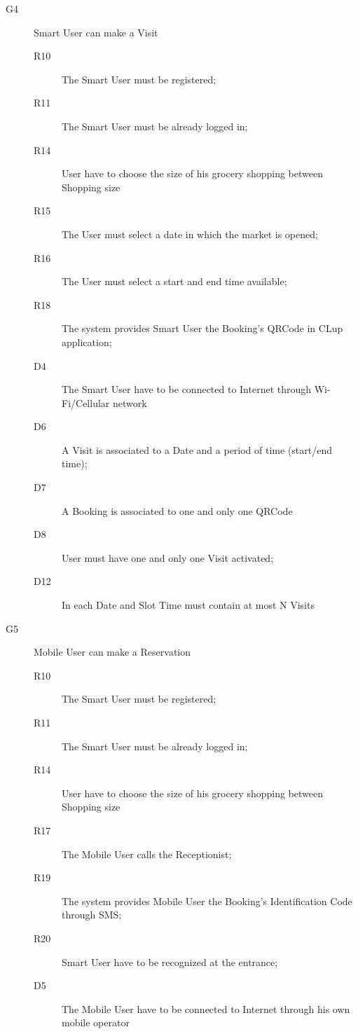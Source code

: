 \begin{description}
    \item[G4]Smart User can make a Visit
    \begin{description}
    \item[R10] The Smart User must be registered;
    \item[R11] The Smart User must be already logged in;
    \item[R14] User have to choose the size of his grocery shopping between Shopping size
    \item[R15] The User must select a date in which the market is opened;
    \item[R16] The User must select a start and end time available;
    \item[R18] The system provides Smart User  the Booking’s QRCode in CLup application;
    \item[D4] The Smart User have to be connected to Internet through Wi-Fi/Cellular network
    \item[D6] A Visit is associated to a Date and a period of time (start/end time);
    \item[D7] A Booking is associated to one and only one QRCode
    \item[D8] User must have one and only one Visit activated;
    \item[D12] In each Date and Slot Time must contain at most N Visits
    \end{description}
    
    \item[G5]Mobile User can make a Reservation
    \begin{description}
    \item[R10] The Smart User must be registered;
    \item[R11] The Smart User must be already logged in;
    \item[R14] User have to choose the size of his grocery shopping between Shopping size
    \item[R17] The Mobile User calls the Receptionist;
    \item[R19] The system provides Mobile User the Booking’s Identification Code through SMS;
    \item[R20] Smart User have to be recognized at the entrance;
    \item[D5] The Mobile User have to be connected to Internet through his own mobile operator
    \end{description}
    

\end{description}
